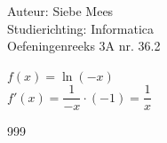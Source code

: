 \documentclass[a4paper]{article}
\begin{document}
  
\noindent \large Auteur: Siebe Mees \\
\noindent \large Studierichting: Informatica\\
\noindent \large Oefeningenreeks 3A nr. 36.2\\

\medskip

\normalsize

$f(x)=\ln (-x)$\\

$ f'(x) = \dfrac{1}{-x} \cdot (-1) = \dfrac{1}{x} $\\

\begin{thebibliography}{999}
\end{thebibliography}
\end{document}
